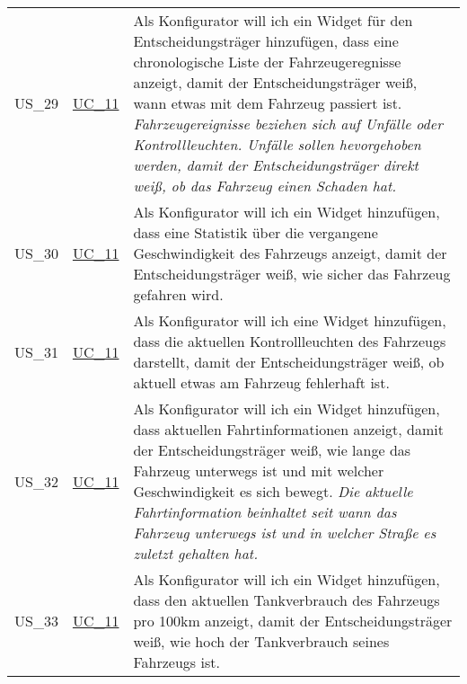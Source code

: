 \begin{footnotesize}
\begin{longtable}[L L L]{ p{} p{} p{} }
      \hypertarget{Ref:US29}{US\_29} & \hyperlink{Ref:UC11}{UC\_11} & Als Konfigurator will ich ein Widget für den Entscheidungsträger hinzufügen, dass eine chronologische Liste der Fahrzeugeregnisse anzeigt, damit der Entscheidungsträger weiß, wann etwas mit dem Fahrzeug passiert ist. 
      \newline\newline
      \emph{Fahrzeugereignisse beziehen sich auf Unfälle oder Kontrollleuchten. Unfälle sollen hevorgehoben werden, damit der Entscheidungsträger direkt weiß, ob das Fahrzeug einen Schaden hat.}
      \\
      \hypertarget{Ref:US30}{US\_30} & \hyperlink{Ref:UC11}{UC\_11} & Als Konfigurator will ich ein Widget hinzufügen, dass eine Statistik über die vergangene Geschwindigkeit des Fahrzeugs anzeigt, damit der Entscheidungsträger weiß, wie sicher das Fahrzeug gefahren wird. \\
      \hypertarget{Ref:US31}{US\_31} & \hyperlink{Ref:UC11}{UC\_11} & Als Konfigurator will ich eine Widget hinzufügen, dass die aktuellen Kontrollleuchten des Fahrzeugs darstellt, damit der Entscheidungsträger weiß, ob aktuell etwas am Fahrzeug fehlerhaft ist. \\
      \hypertarget{Ref:US32}{US\_32} & \hyperlink{Ref:UC11}{UC\_11} & Als Konfigurator will ich ein Widget hinzufügen, dass aktuellen Fahrtinformationen anzeigt, damit der Entscheidungsträger weiß, wie lange das Fahrzeug unterwegs ist und mit welcher Geschwindigkeit es sich bewegt.
      \newline\newline
      \emph{Die aktuelle Fahrtinformation beinhaltet seit wann das Fahrzeug unterwegs ist und in welcher Straße es zuletzt gehalten hat.}\\
      \hypertarget{Ref:US33}{US\_33} & \hyperlink{Ref:UC11}{UC\_11} & Als Konfigurator will ich ein Widget hinzufügen, dass den aktuellen Tankverbrauch des Fahrzeugs pro 100km anzeigt, damit der Entscheidungsträger weiß, wie hoch der Tankverbrauch seines Fahrzeugs ist. \\

      \bottomrule
    \end{longtable}
  \end{footnotesize}
  \rmfamily

